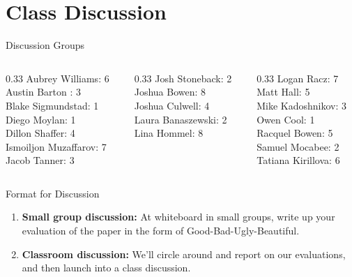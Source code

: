 \documentclass[10pt]{beamer}
\begin{document}
\section{Class Discussion}

\begin{frame}{Discussion Groups}
\begin{columns}
\begin{column}{0.33\textwidth}
Aubrey Williams: 6 \\ 
Austin Barton : 3 \\ 
Blake Sigmundstad: 1 \\ 
Diego Moylan: 1 \\ 
Dillon Shaffer: 4 \\ 
Ismoiljon Muzaffarov: 7 \\ 
Jacob Tanner: 3 \\\end{column}
\begin{column}{0.33\textwidth}
Josh Stoneback: 2 \\ 
Joshua Bowen: 8 \\ 
Joshua Culwell: 4 \\ 
Laura Banaszewski: 2 \\ 
Lina Hommel: 8 \\\end{column}
\begin{column}{0.33\textwidth}
Logan Racz: 7 \\ 
Matt Hall: 5 \\ 
Mike Kadoshnikov: 3 \\ 
Owen Cool: 1 \\ 
Racquel Bowen: 5 \\ 
Samuel Mocabee: 2 \\ 
Tatiana Kirillova: 6 \\\end{column}
\end{columns}

\end{frame}

\begin{frame}{Format for Discussion}

\begin{enumerate}
	\item \textbf{Small group discussion:} At whiteboard in small groups, write up your evaluation of the paper in the form of \alert{Good-Bad-Ugly-Beautiful}.
	\item \textbf{Classroom discussion:} We'll circle around and report on our evaluations, and then launch into a class discussion.
\end{enumerate}
	
\end{frame}
\end{document}
